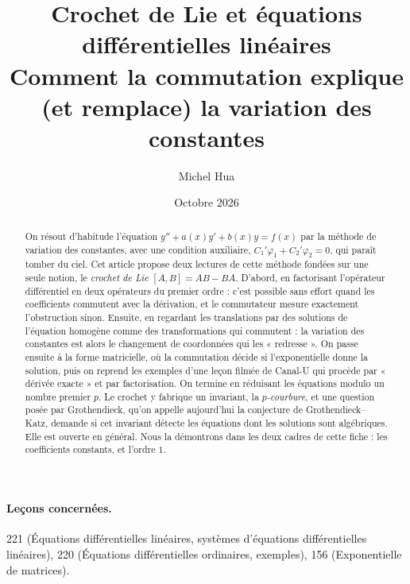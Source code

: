 \documentclass[11pt,a4paper]{article}
\title{Crochet de Lie et équations différentielles linéaires\\[2pt]
\large Comment la commutation explique (et remplace) la variation des constantes}
\author{Michel Hua}
\date{Octobre 2026}
\theoremstyle{plain}
\theoremstyle{definition}
\theoremstyle{remark}
\begin{document}
\maketitle

\begin{abstract}
On résout d'habitude l'équation $y''+a(x)y'+b(x)y=f(x)$ par la méthode de variation des constantes, avec une condition auxiliaire, $C_1'\varphi_1+C_2'\varphi_2=0$, qui paraît tomber du ciel. Cet article propose deux lectures de cette méthode fondées sur une seule notion, le \emph{crochet de Lie} $[A,B]=AB-BA$. D'abord, en factorisant l'opérateur différentiel en deux opérateurs du premier ordre : c'est possible sans effort quand les coefficients commutent avec la dérivation, et le commutateur mesure exactement l'obstruction sinon. Ensuite, en regardant les translations par des solutions de l'équation homogène comme des transformations qui commutent : la variation des constantes est alors le changement de coordonnées qui les « redresse ». On passe ensuite à la forme matricielle, où la commutation décide si l'exponentielle donne la solution, puis on reprend les exemples d'une leçon filmée de Canal-U qui procède par « dérivée exacte » et par factorisation. On termine en réduisant les équations modulo un nombre premier $p$. Le crochet y fabrique un invariant, la \emph{$p$-courbure}, et une question posée par Grothendieck, qu'on appelle aujourd'hui la conjecture de Grothendieck--Katz, demande si cet invariant détecte les équations dont les solutions sont algébriques. Elle est ouverte en général. Nous la démontrons dans les deux cadres de cette fiche : les coefficients constants, et l'ordre $1$.
\end{abstract}

\paragraph{Leçons concernées.} 221 (Équations différentielles linéaires, systèmes d'équations différentielles linéaires), 220 (Équations différentielles ordinaires, exemples), 156 (Exponentielle de matrices).
\end{document}
